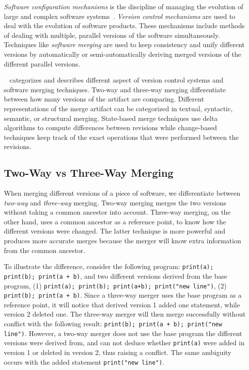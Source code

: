 \documentclass[a4paper,english]{ifimaster}
\begin{document}
\textit{Software configuration mechanisms} is the discipline of managing the evolution of large and complex software systems~\cite{cite:software_configuration_management}. \textit{Version control mechanisms} are used to deal with the evolution of software products. These mechanisms include methods of dealing with multiple, parallel versions of the software simultaneously. Techniques like \textit{software merging} are used to keep consistency and unify different versions by automatically or semi-automatically deriving merged versions of the different parallel versions.

\citeauthor{cite:tom_mens_software_merging_survey}~\cite{cite:tom_mens_software_merging_survey} categorizes and describes different aspect of version control systems and software merging techniques. Two-way and three-way merging differentiate between how many versions of the artifact are comparing. Different representations of the merge artifact can be categorized in textual, syntactic, semantic, or structural merging. State-based merge techniques use delta algorithms to compute differences between revisions while change-based techniques keep track of the exact operations that were performed between the revisions.

\subsection{Two-Way vs Three-Way Merging}%
\label{sub:two_way_vs_three_way_merging}

When merging different versions of a piece of software, we differentiate between \textit{two-way} and \textit{three-way} merging. Two-way merging merges the two versions without taking a common ancestor into account. Three-way merging, on the other hand, uses a common ancestor as a reference point, to know how the different versions were changed. The latter technique is more powerful and produces more accurate merges because the merger will know extra information from the common ancestor.

To illustrate the difference, consider the following program: \texttt{print(a); print(b); print(a + b)}, and two different versions derived from the base program, (1) \texttt{print(a); print(b); print(a+b); print("new line")}, (2) \texttt{print(b); print(a + b)}. Since a three-way merger uses the base program as a reference point, it will notice that derived version 1 added one statement, while version 2 deleted one. The three-way merger will then merge successfully without conflict with the following result: \texttt{print(b); print(a + b); print("new line")}. However, a two-way merger does not use the base program the different versions were derived from, and can not deduce whether \texttt{print(a)} were added in version 1 or deleted in version 2, thus raising a conflict. The same ambiguity occurs with the added statement \texttt{print("new line")}.
\end{document}
